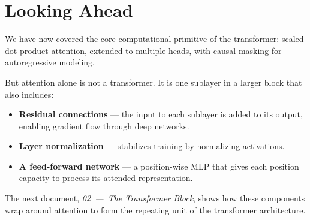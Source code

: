 \section{Looking Ahead}

We have now covered the core computational primitive of the transformer: scaled dot-product attention, extended to multiple heads, with causal masking for autoregressive modeling.

But attention alone is not a transformer. It is one sublayer in a larger block that also includes:

\begin{itemize}
  \item \textbf{Residual connections} --- the input to each sublayer is added to its output, enabling gradient flow through deep networks.
  \item \textbf{Layer normalization} --- stabilizes training by normalizing activations.
  \item \textbf{A feed-forward network} --- a position-wise MLP that gives each position capacity to process its attended representation.
\end{itemize}

The next document, \textit{02~---~The Transformer Block}, shows how these components wrap around attention to form the repeating unit of the transformer architecture.



